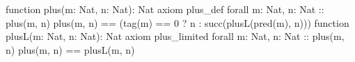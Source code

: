 function plus(m: Nat, n: Nat): Nat
axiom plus_def {
    forall m: Nat, n: Nat :: {plus(m, n)} 
        plus(m, n) == (tag(m) == 0 ? n : succ(plusL(pred(m), n)))
}
function plusL(m: Nat, n: Nat): Nat
axiom plus_limited {
    forall m: Nat, n: Nat :: {plus(m, n)} plus(m, n) == plusL(m, n)
}